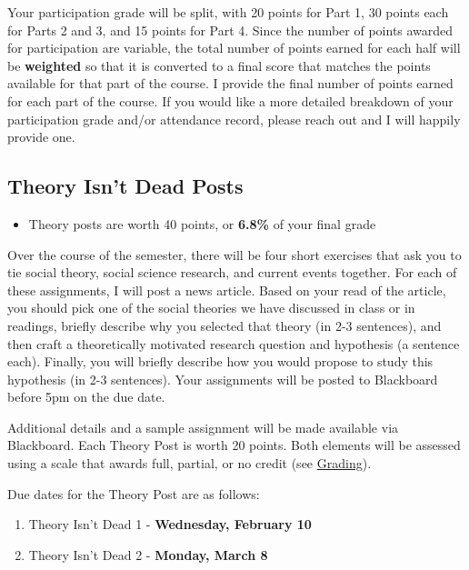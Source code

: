 \documentclass[
]{book}
\providecommand{\tightlist}{%
  \setlength{\itemsep}{0pt}\setlength{\parskip}{0pt}}
\newenvironment{rmdblock}[1]
  {\begin{shaded*}
  \begin{itemize}
  \renewcommand{\labelitemi}{
    \raisebox{-.7\height}[0pt][0pt]{
      {\setkeys{Gin}{width=3em,keepaspectratio}\texttt{[image: images/\#1]}}
    }
  }
  \item
  }
  {
  \end{itemize}
  \end{shaded*}
  }
\newenvironment{rmdtip}
  {\begin{rmdblock}{tip}}
  {\end{rmdblock}}
\begin{document}
Your participation grade will be split, with 20 points for Part 1, 30 points each for Parts 2 and 3, and 15 points for Part 4. Since the number of points awarded for participation are variable, the total number of points earned for each half will be \textbf{weighted} so that it is converted to a final score that matches the points available for that part of the course. I provide the final number of points earned for each part of the course. If you would like a more detailed breakdown of your participation grade and/or attendance record, please reach out and I will happily provide one.

\hypertarget{theory-isnt-dead-posts}{%
\subsection{Theory Isn't Dead Posts}\label{theory-isnt-dead-posts}}

\begin{rmdtip}
Theory posts are worth 40 points, or \textbf{6.8\%} of your final grade
\end{rmdtip}

Over the course of the semester, there will be four short exercises that ask you to tie social theory, social science research, and current events together. For each of these assignments, I will post a news article. Based on your read of the article, you should pick one of the social theories we have discussed in class or in readings, briefly describe why you selected that theory (in 2-3 sentences), and then craft a theoretically motivated research question and hypothesis (a sentence each). Finally, you will briefly describe how you would propose to study this hypothesis (in 2-3 sentences). Your assignments will be posted to Blackboard before 5pm on the due date.

Additional details and a sample assignment will be made available via Blackboard. Each Theory Post is worth 20 points. Both elements will be assessed using a scale that awards full, partial, or no credit (see \href{grading.html}{Grading}).

Due dates for the Theory Post are as follows:

\begin{enumerate}
\def\labelenumi{\arabic{enumi}.}
\tightlist
\item
  Theory Isn't Dead 1 - \textbf{Wednesday, February 10}
\item
  Theory Isn't Dead 2 - \textbf{Monday, March 8}
\end{enumerate}
\end{document}
